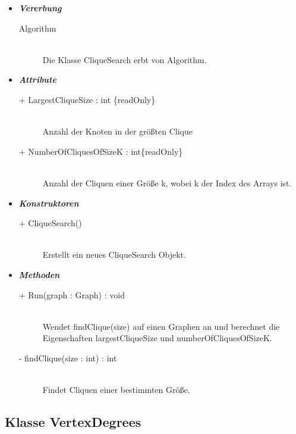 \documentclass[13pt]{scrreprt}
\begin{document}
	\begin{itemize}[label = {$\circ$}]
		\item {\large \textbf{\textit{Vererbung}}\par}
		\begin{description}
			\item[Algorithm] \hfill \\ Die Klasse CliqueSearch erbt von Algorithm.
		\end{description}
		\item {\large \textbf{\textit{Attribute}}\par}
		\begin{description}
			\item [+ LargestCliqueSize : int \{readOnly\}] \hfill \\Anzahl der Knoten in der größten Clique
			\item [+ NumberOfCliquesOfSizeK : int\lbrack\rbrack \{readOnly\}] \hfill \\Anzahl der Cliquen einer Größe k, wobei k der Index des Arrays ist.
		\end{description}
		\item {\large \textbf{\textit{Konstruktoren}}\par}
		\begin{description}
			\item [+ CliqueSearch()] \hfill \\Erstellt ein neues CliqueSearch Objekt.
		\end{description}
		\item {\large \textbf{\textit{Methoden}}\par}
		\begin{description}
			\item [+ Run(graph : Graph) : void] \hfill \\Wendet findClique(size) auf einen Graphen an und berechnet die Eigenschaften largestCliqueSize und numberOfCliquesOfSizeK.
			\item [- findClique(size : int) : int] \hfill \\Findet Cliquen einer bestimmten Größe.
		\end{description}
	\end{itemize}
	
	\subsection{Klasse VertexDegrees}
	
\end{document}
